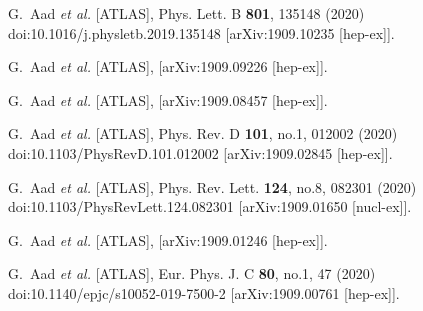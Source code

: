 \begin{thebibliography}{9}
G.~Aad \textit{et al.} [ATLAS],
Phys. Lett. B \textbf{801}, 135148 (2020)
doi:10.1016/j.physletb.2019.135148
[arXiv:1909.10235 [hep-ex]].

G.~Aad \textit{et al.} [ATLAS],
[arXiv:1909.09226 [hep-ex]].

G.~Aad \textit{et al.} [ATLAS],
[arXiv:1909.08457 [hep-ex]].

G.~Aad \textit{et al.} [ATLAS],
Phys. Rev. D \textbf{101}, no.1, 012002 (2020)
doi:10.1103/PhysRevD.101.012002
[arXiv:1909.02845 [hep-ex]].

G.~Aad \textit{et al.} [ATLAS],
Phys. Rev. Lett. \textbf{124}, no.8, 082301 (2020)
doi:10.1103/PhysRevLett.124.082301
[arXiv:1909.01650 [nucl-ex]].

G.~Aad \textit{et al.} [ATLAS],
[arXiv:1909.01246 [hep-ex]].

G.~Aad \textit{et al.} [ATLAS],
Eur. Phys. J. C \textbf{80}, no.1, 47 (2020)
doi:10.1140/epjc/s10052-019-7500-2
[arXiv:1909.00761 [hep-ex]].


\end{thebibliography}
